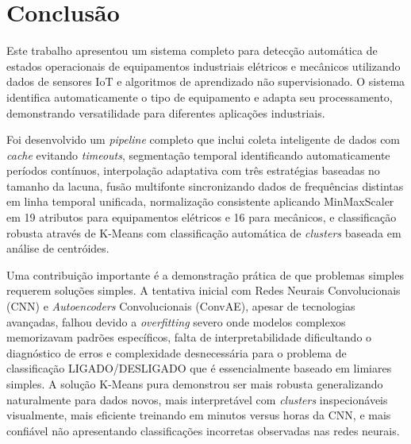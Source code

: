 \chapter{Conclusão}
\label{chap:conclusao}

Este trabalho apresentou um sistema completo para detecção automática de estados operacionais de equipamentos industriais elétricos e mecânicos utilizando dados de sensores IoT e algoritmos de aprendizado não supervisionado. O sistema identifica automaticamente o tipo de equipamento e adapta seu processamento, demonstrando versatilidade para diferentes aplicações industriais.

Foi desenvolvido um \textit{pipeline} completo que inclui coleta inteligente de dados com \textit{cache} evitando \textit{timeouts}, segmentação temporal identificando automaticamente períodos contínuos, interpolação adaptativa com três estratégias baseadas no tamanho da lacuna, fusão multifonte sincronizando dados de frequências distintas em linha temporal unificada, normalização consistente aplicando MinMaxScaler em 19 atributos para equipamentos elétricos e 16 para mecânicos, e classificação robusta através de K-Means com classificação automática de \textit{clusters} baseada em análise de centróides.

Uma contribuição importante é a demonstração prática de que problemas simples requerem soluções simples. A tentativa inicial com Redes Neurais Convolucionais (CNN) e \textit{Autoencoders} Convolucionais (ConvAE), apesar de tecnologias avançadas, falhou devido a \textit{overfitting} severo onde modelos complexos memorizavam padrões específicos, falta de interpretabilidade dificultando o diagnóstico de erros e complexidade desnecessária para o problema de classificação LIGADO/DESLIGADO que é essencialmente baseado em limiares simples. A solução K-Means pura demonstrou ser mais robusta generalizando naturalmente para dados novos, mais interpretável com \textit{clusters} inspecionáveis visualmente, mais eficiente treinando em minutos versus horas da CNN, e mais confiável não apresentando classificações incorretas observadas nas redes neurais.

